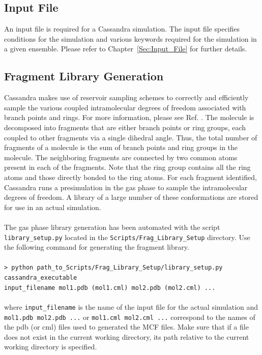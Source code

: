 \subsection{Input File}
%
%
An input file is required for a Cassandra simulation. The input file
specifies conditions for the simulation and various keywords required
for the simulation in a given ensemble. Please refer to 
Chapter~\ref{Sec:Input_File}  for further details.
%
\subsection{Fragment Library Generation}
Cassandra makes use of reservoir sampling schemes to correctly and efficiently sample the various coupled intramolecular degrees of freedom associated with
branch points and rings. For more information, please see Ref. \cite{Shah:2011}. 
The molecule is decomposed 
into fragments that are either branch points or ring groups,
each coupled to other fragments via a single dihedral angle. Thus, the
total number of fragments of a molecule is the sum of branch points
and ring groups in the molecule. The neighboring fragments are
connected by two common atoms present in each of the fragments. Note
that the ring group contains all the ring atoms and those directly
bonded to the ring atoms. For each fragment identified, Cassandra runs
a pre\textendash simulation in the gas phase to sample the intramolecular degrees
of freedom. A library of a large number of these conformations are
stored for use in an actual simulation. \\ \\
%
%
The gas phase library generation has been automated with the script \texttt{library\_setup.py} located in the \texttt{Scripts/Frag\_Library\_Setup}
directory. Use the following command for generating the fragment library. \\ \\
%
\texttt{> python path\_to\_Scripts/Frag\_Library\_Setup/library\_setup.py cassandra\_executable \\ input\_filename mol1.pdb (mol1.cml)  mol2.pdb (mol2.cml) ...}\\ \\
%
where \texttt{input\_filename} is the name of the input file for the actual simulation and \texttt{mol1.pdb mol2.pdb ...} or \texttt{mol1.cml mol2.cml ...} correspond to the
names of the pdb (or cml) files used to generated the MCF files. Make sure that if a file does not exist in the current working directory, its path relative
to the current working directory is specified. 

